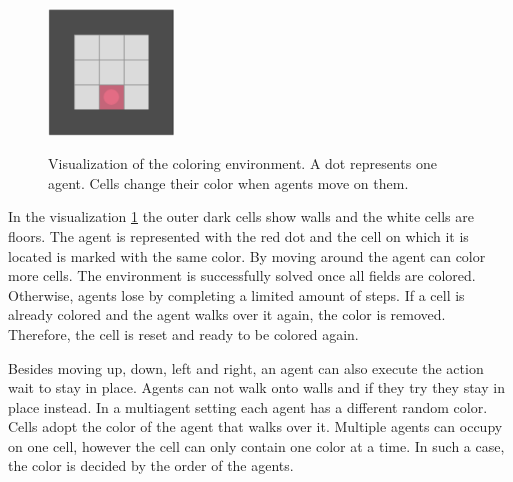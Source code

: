 

\begin{figure}[hpbt]
    \centering
    \includegraphics[width=0.3\textwidth]{pictures/Gridworld}\\
    \caption[Coloring Environment]{Visualization of the coloring environment. A dot represents one agent. Cells change their color when agents move on them.}\label{fig:env}
\end{figure}

In the visualization \ref{fig:env} the outer dark cells show walls and the white cells are floors. The agent is represented with the red dot and the cell on which it is located is marked with the same color. By moving around the agent can color more cells. The environment is successfully solved once all fields are colored. Otherwise, agents lose by completing a limited amount of steps. If a cell is already colored and the agent walks over it again, the color is removed. Therefore, the cell is reset and ready to be colored again. 

Besides moving up, down, left and right, an agent can also execute the action wait to stay in place. Agents can not walk onto walls and if they try they stay in place instead. In a multiagent setting each agent has a different random color. Cells adopt the color of the agent that walks over it. Multiple agents can occupy on one cell, however the cell can only contain one color at a time. In such a case, the color is decided by the order of the agents. 

